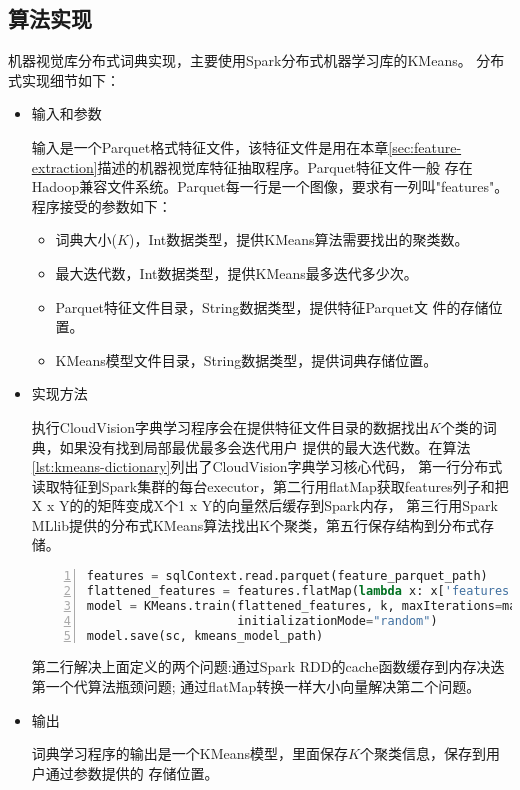 \subsection*{算法实现}
机器视觉库分布式词典实现，主要使用Spark分布式机器学习库的KMeans。
分布式实现细节如下：
\begin{itemize}
  \item 输入和参数

        输入是一个Parquet格式特征文件，该特征文件是用在本章\ref{sec:feature-extraction}描述的机器视觉库特征抽取程序。Parquet特征文件一般
        存在Hadoop兼容文件系统。Parquet每一行是一个图像，要求有一列叫"features"。
        程序接受的参数如下：
        \begin{itemize}
          \item 词典大小($K$)，Int数据类型，提供KMeans算法需要找出的聚类数。
          \item 最大迭代数，Int数据类型，提供KMeans最多迭代多少次。
          \item Parquet特征文件目录，String数据类型，提供特征Parquet文
                件的存储位置。
          \item KMeans模型文件目录，String数据类型，提供词典存储位置。
        \end{itemize}

  \item 实现方法

        执行CloudVision字典学习程序会在提供特征文件目录的数据找出$K$个类的词典，如果没有找到局部最优最多会迭代用户
        提供的最大迭代数。在算法\ref{lst:kmeans-dictionary}列出了CloudVision字典学习核心代码，
        第一行分布式读取特征到Spark集群的每台executor，第二行用flatMap获取features列子和把X x Y的的矩阵变成X个1 x Y的向量然后缓存到Spark内存，
        第三行用Spark MLlib提供的分布式KMeans算法找出K个聚类，第五行保存结构到分布式存储。
        \begin{lstlisting}[language=Python,
                           basicstyle=\small,
                           showstringspaces=false,
                           numbers=left,
                           caption={词典学习核心代码},
                           label={lst:kmeans-dictionary}]
features = sqlContext.read.parquet(feature_parquet_path)
flattened_features = features.flatMap(lambda x: x['features']).cache()
model = KMeans.train(flattened_features, k, maxIterations=maxIter,
                     initializationMode="random")
model.save(sc, kmeans_model_path)
        \end{lstlisting}
        第二行解决上面定义的两个问题:通过Spark RDD的cache函数缓存到内存决迭第一个代算法瓶颈问题;
        通过flatMap转换一样大小向量解决第二个问题。


  \item 输出

        词典学习程序的输出是一个KMeans模型，里面保存$K$个聚类信息，保存到用户通过参数提供的
        存储位置。
\end{itemize}


